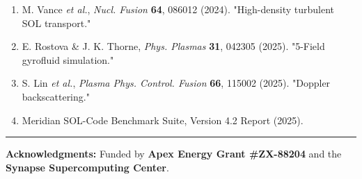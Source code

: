 \documentclass[landscape,a0,final]{a0poster}
\newlength{\colwidth}
\begin{document}
\begin{minipage}[t]{\colwidth}
  \begin{tcolorbox}[posterbox, title={\faBook\ 9. References \& Acknowledgments}]
    \footnotesize
    \begin{enumerate}[leftmargin=1.2em, itemsep=2pt]
      \item M. Vance \textit{et al.}, \textit{Nucl. Fusion} \textbf{64}, 086012 (2024). "High-density turbulent SOL transport."
      \item E. Rostova \& J. K. Thorne, \textit{Phys. Plasmas} \textbf{31}, 042305 (2025). "5-Field gyrofluid simulation."
      \item S. Lin \textit{et al.}, \textit{Plasma Phys. Control. Fusion} \textbf{66}, 115002 (2025). "Doppler backscattering."
      \item Meridian SOL-Code Benchmark Suite, Version 4.2 Report (2025).
    \end{enumerate}

    \vspace{4pt}
    \hrule
    \vspace{4pt}
    \textbf{Acknowledgments:} Funded by \textbf{Apex Energy Grant \#ZX-88204} and the \textbf{Synapse Supercomputing Center}.
  \end{tcolorbox}

\end{minipage}
\end{document}

